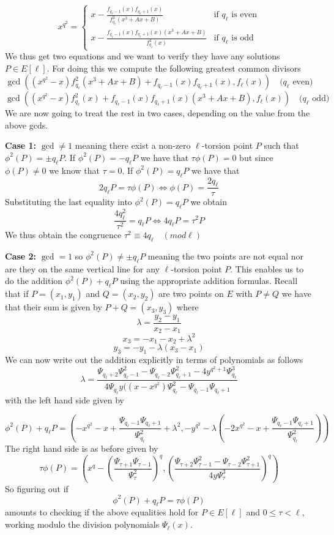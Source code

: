 $$
x^{q^2} = \begin{cases}
           x - \frac{f_{q_\ell-1}(x) f_{q_\ell+1}(x)}{f_{q_\ell}^2 (x^3+Ax+B)} & \text{if } q_\ell \text{ is even} \\
	   x - \frac{f_{q_\ell-1}(x) f_{q_\ell+1}(x) (x^3+Ax+B)}{f_{q_\ell}^2(x)} & \text{if } q_\ell \text{ is odd} 
          \end{cases}
$$
We thus get two equations and we want to verify they have any solutions $P \in E[\ell]$. For
doing this we compute the following greatest common divisors
$$ \gcd((x^{q^2} - x)f_{q_\ell}^2 (x^3+Ax+B)+f_{q_\ell-1}(x) f_{q_\ell+1}(x), f_\ell(x)) \quad (q_\ell \text{ even)}$$
$$ \gcd((x^{q^2} - x)f_{q_\ell}^2(x)+f_{q_\ell-1}(x) f_{q_\ell+1}(x) (x^3+Ax+B), f_\ell(x)) \quad (q_\ell \text{ odd)}$$
We are now going to treat the rest in two cases, depending on the value from the above gcds.

\textbf{Case 1:} $\gcd \neq 1$ meaning there exist a non-zero $\ell$-torsion point $P$ such that $\phi^2(P) = \pm q_\ell P$.
If $\phi^2 (P) = -q_\ell P$ we have that $\tau \phi(P) = 0$ but since $\phi(P) \neq 0$ we know that $\tau = 0$.
If $\phi^2(P) = q_\ell P$ we have that 
$$ 2 q_\ell P = \tau \phi(P) \Leftrightarrow \phi(P) = \frac{2 q_\ell}{\tau} $$
Substituting the last equality into $\phi^2(P) = q_\ell P$ we obtain
$$ \frac{4 q_\ell^2}{\tau^2} = q_\ell P \Leftrightarrow 4 q_\ell P = \tau^2 P $$
We thus obtain the congruence $\tau^2 \equiv 4q_\ell \quad (mod \ell)$

\textbf{Case 2:} $\gcd = 1$ so $\phi^2(P) \neq \pm q_\ell P$ meaning the two points are 
not equal nor are they on the same vertical line for any $\ell$-torsion point $P$. 
This enables us to do the addition $\phi^2(P) + q_\ell P$ using the appropriate addition formulas.
Recall that if $P = (x_1, y_1)$ and $Q = (x_2, y_2)$ are two points on $E$ with
$P \neq Q$ we have that their sum is given by $P+Q = (x_3, y_3)$ where
$$ \lambda = \frac{y_2 - y_1}{x_2 - x_1} $$
$$ x_3 = -x_1 - x_2 + \lambda^2 $$
$$ y_3 = -y_1 -\lambda(x_3 - x_1) $$
We can now write out the addition explicitly in terms of polynomials as follows
$$ \lambda = \frac{\Psi_{q_\ell+2} \Psi_{q_\ell-1}^2 - \Psi_{q_\ell-2}\Psi_{q_\ell+1}^2 - 4y^{q^2+1}\Psi_{q_\ell}^3}
		  {4\Psi_{q_\ell} y ((x-x^{q^2})\Psi_{q_\ell}^2 - \Psi_{q_\ell-1}\Psi_{q_\ell+1}} $$
with the left hand side given by

$$\phi^2 (P) + q_\ell P = \left(-x^{q^2}-x+\frac{\Psi_{q_\ell-1}\Psi_{q_\ell+1}}{\Psi_{q_\ell}^2}+\lambda^2,
		     -y^{q^2}-\lambda\left(-2x^{q^2}-x+\frac{\Psi_{q_\ell-1}\Psi_{q_\ell+1}}{\Psi_{q_\ell}^2}\right)\right)$$
The right hand side is as before given by
$$ \tau\phi(P)=\left(x^q-\left(\frac{\Psi_{\tau+1}\Psi_{\tau-1}}{\Psi_\tau^2}\right)^q,\left(\frac{\Psi_{\tau+2}\Psi_{\tau-1}^2 - \Psi_{\tau-2}\Psi_{\tau+1}^2}{4y\Psi_\tau^3}\right)^q\right) $$
So figuring out if $$\phi^2(P) + q_\ell P = \tau \phi(P) $$ amounts to checking if the above equalities
hold for $P\in E[\ell]$ and $0 \leq \tau < \ell$, working modulo the division polynomials $\Psi_\ell(x)$. 
